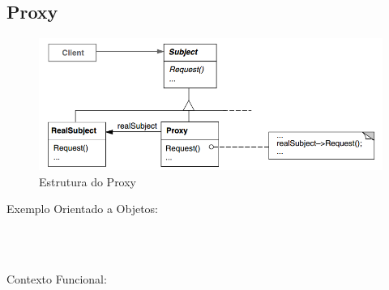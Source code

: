 \subsection{Proxy}

\begin{figure}[htb]
	\caption{\label{fig_grafico}Estrutura do Proxy}
	\begin{center}
	    \includegraphics[scale=0.5]{5_padroes-contexto-funcional/5.2_estruturais/5.2.7_proxy/diagram.png}
	\end{center}
\end{figure}

Exemplo Orientado a Objetos:

\begin{lstlisting}[caption={Proxy Orientado a Objetos},label=ooproxy]



\end{lstlisting}

Contexto Funcional:


\begin{lstlisting}[caption={Proxy Funcional},label=fpproxy]
    

    
\end{lstlisting}
